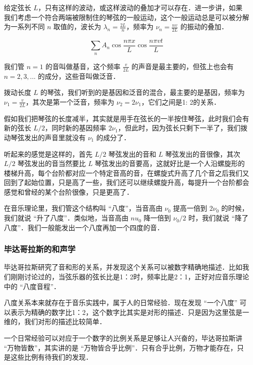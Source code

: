 给定弦长 $L$，只有这样的波动，或这样波动的叠加才可以存在．进一步讲，如果我们考虑一个符合两端被限制住的琴弦的一般运动，这个一般运动总是可以被分解为一系列不同 $n$ 取值的，波长为 $\lambda_n = \frac{2L}{n}$，频率为 $\nu_n = \frac{n v}{2 L }$ 的振动的叠加．

\begin{equation}
\sum\limits_{n} A_n \cos \frac{n \pi x}{L} \cos \frac{n \pi vt}{L}
\end{equation}

我们管 $n = 1$ 的音叫做基音，这个频率 $\frac{v}{2L}$ 的声音是最主要的，但弦上也会有 $n= 2, 3, ...$ 的成分，这些音叫做泛音．

拨动长度 $L$ 的琴弦，我们听到的是基因和泛音的混合，最主要的是基因，频率为 $\nu_1 = \frac{v}{2L} $，其次是第一个泛音，频率为 $\nu_2 = 2 \nu_1$，它们之间是1: 2的关系．

假如我们把琴弦的长度减半，其实就是用手在弦长的一半按住琴弦，此时我们会有新的弦长 $L/2$，同时新的基因频率 $2 \nu_1$，但此时，因为弦长只剩下一半了，我们拨动琴弦发出的声音里就没有 $\nu_1$ 的成分了．

听起来的感觉是这样的，首先 $L/2$ 琴弦发出的音和 $L$ 琴弦发出的音很像，其次 $L/2$ 琴弦发出的音当然要比 $L$ 琴弦发出的音要高，这就好比是一个人沿螺旋形的楼梯升高，每个台阶都对应一个特定音高的音，在螺旋式升高了几个音之后我们又回到了起始位置，只是高了一些，我们还可以继续螺旋升高，每提升一个台阶都会感觉和曾经的某个台阶很像，只是更高了．

在音乐理论里，我们管这个结构叫 “八度”，当音高由 $\nu_0$ 提高一倍到 $2 \nu_0$ 的时候，我们就说 “升了八度”．类似地，当音高由 $nu_0$ 降一倍到 $\nu_0 /2$ 时，我们就说 “降了八度”．我们一般能发出一个八度再加一个四度的音．

\subsubsection{毕达哥拉斯的和声学}

毕达哥拉斯研究了音和形的关系，并发现这个关系可以被数字精确地描述．比如我们刚刚讨论过的，当弦乐器的弦长比是1：2时，频率比是2：1，正好对应音乐理论中的 “八度音程”．

八度关系本来就存在于音乐实践中，属于人的日常经验．现在发现 “一个八度” 可以表示为精确的数字比1：2，这个数字比其实是对形的描述．只是因为这里弦是一维的，我们对形的描述比较简单．

一个日常经验可以对应于一个数字的比例关系是足够让人兴奋的，毕达哥拉斯讲 “万物皆数”，其实讲的是 “万物皆合乎比例”．只有合乎比例，万物才能存在，只是这些比例有待我们的发现．

